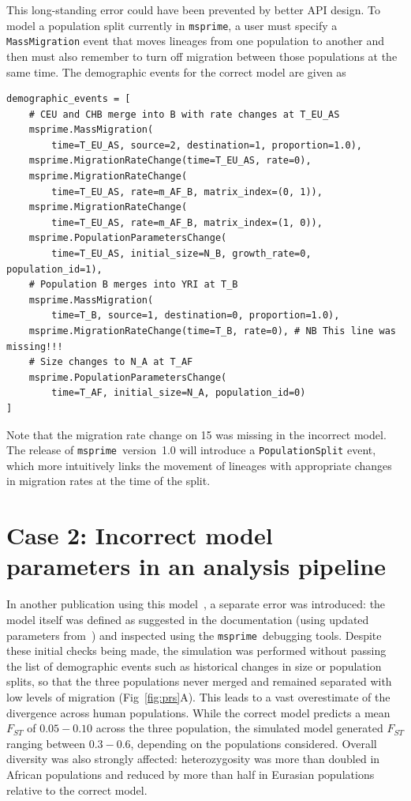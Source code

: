 \documentclass{article}
\newcommand{\msprime}[0]{\texttt{msprime}}
\begin{document}
This long-standing error could have been prevented by better API design.
To model a population split currently in \msprime, a user must specify a
\texttt{MassMigration} event that moves lineages from one population to another
and then must also remember to turn off migration
between those populations at the same time.
The demographic events for the correct model are given as


\begin{verbatim}
demographic_events = [
    # CEU and CHB merge into B with rate changes at T_EU_AS
    msprime.MassMigration(
        time=T_EU_AS, source=2, destination=1, proportion=1.0),
    msprime.MigrationRateChange(time=T_EU_AS, rate=0),
    msprime.MigrationRateChange(
        time=T_EU_AS, rate=m_AF_B, matrix_index=(0, 1)),
    msprime.MigrationRateChange(
        time=T_EU_AS, rate=m_AF_B, matrix_index=(1, 0)),
    msprime.PopulationParametersChange(
        time=T_EU_AS, initial_size=N_B, growth_rate=0, population_id=1),
    # Population B merges into YRI at T_B
    msprime.MassMigration(
        time=T_B, source=1, destination=0, proportion=1.0),
    msprime.MigrationRateChange(time=T_B, rate=0), # NB This line was missing!!!
    # Size changes to N_A at T_AF
    msprime.PopulationParametersChange(
        time=T_AF, initial_size=N_A, population_id=0)
]
\end{verbatim}
Note that the migration rate change on 15 was missing in the incorrect model.
The release of \msprime\ version~1.0 will introduce a \texttt{PopulationSplit} event,
which more intuitively links the movement of lineages with appropriate changes in
migration rates at the time of the split.

\section*{Case 2: Incorrect model parameters in an analysis pipeline}

In another publication using this model~\citep{martin2017human},
a separate error was introduced: the model itself was defined as suggested
in the documentation (using updated parameters
from~\citet{gravel2011demographic}) and inspected
using the \msprime\ debugging tools.
Despite these initial checks being made, the simulation
was performed without passing the list of demographic events such as historical
changes in size or population splits, so that the three populations
never merged and remained separated with low levels of migration (Fig~\ref{fig:prs}A).
This leads to a vast overestimate of the divergence across human populations.
While the correct model predicts a mean $F_{ST}$ of
$0.05 - 0.10$ across the three population, the simulated model generated $F_{ST}$
ranging between $0.3 - 0.6$, depending on the populations considered.
Overall diversity was also strongly affected: heterozygosity was more than
doubled in African populations and reduced by more than half in Eurasian populations
relative to the correct model.
\end{document}

